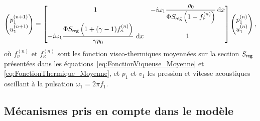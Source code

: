 
\begin{equation}
	\begin{pmatrix}
	p_1^{(n+1)}\\
	u_1^{(n+1)}
	\end{pmatrix}=\begin{bmatrix}
	1 & -i\omega_1\dfrac{\rho_0}{\Phi S_{\sf reg}\left(1-f_\nu^{(n)}\right)}\,\mathrm{d} x\\
	-i\omega_1\dfrac{\Phi S_{\sf reg} \left(1 + (\gamma-1)f_\kappa^{(n)}\right)}{\gamma p_0}\ \mathrm{d} x & 1
	\end{bmatrix}\begin{pmatrix}
	p_1^{(n)}\\
	u_1^{(n)}
	\end{pmatrix},
\end{equation}
où $f_\nu^{(n)}$ et $f_\kappa^{(n)}$ sont les fonction visco-thermiques moyennées sur la section $S_{\sf reg}$ présentées dans les équations~\eqref{eq:FonctionViqueuse_Moyenne} et \eqref{eq:FonctionThermique_Moyenne}, et $p_1$ et $v_1$ les pression et vitesse acoustiques oscillant à la pulsation $\omega_1=2\pi f_1$.

\subsection{Mécanismes pris en compte dans le modèle}

